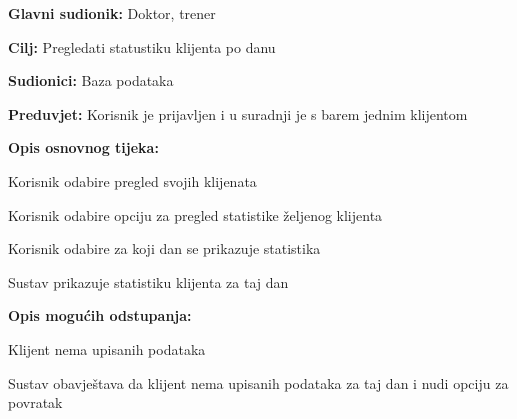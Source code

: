 					\noindent {}
					\begin{packed_item}
						
						\item \textbf{Glavni sudionik:} Doktor, trener
						\item  \textbf{Cilj:} Pregledati statustiku klijenta po danu
						\item  \textbf{Sudionici:} Baza podataka
						\item  \textbf{Preduvjet:} Korisnik je prijavljen i u suradnji je s barem jednim klijentom
						\item  \textbf{Opis osnovnog tijeka:}
						
						\item[] \begin{packed_enum}
							
							\item Korisnik odabire pregled svojih klijenata
							\item Korisnik odabire opciju za pregled statistike željenog klijenta
							\item Korisnik odabire za koji dan se prikazuje statistika
							\item Sustav prikazuje statistiku klijenta za taj dan
							
						\end{packed_enum}
					
						\item  \textbf{Opis mogućih odstupanja:}
						
						\item[] \begin{packed_item}
							
							\item[4.a] Klijent nema upisanih podataka 
							\item[] \begin{packed_enum}
								
								\item Sustav obavještava da klijent nema upisanih podataka za taj dan i nudi opciju za povratak
								
							\end{packed_enum}
							
						\end{packed_item}	
						
					\end{packed_item}
			
